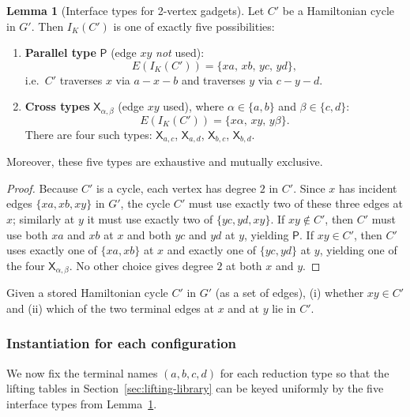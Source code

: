 \documentclass[12pt]{article}
\theoremstyle{definition}
\newtheorem{lemma}[theorem]{Lemma}
\newcommand{\CtwoGadgetVertices}{2}
\begin{document}
\begin{lemma}[Interface types for \CtwoGadgetVertices-vertex gadgets]
\label{lem:interfaces-2vertex}
Let $C'$ be a Hamiltonian cycle in $G'$. Then $I_K(C')$ is one of exactly five
possibilities:
\begin{enumerate}
    \item \textbf{Parallel type} $\mathsf{P}$ (edge $xy$ \emph{not} used):
    \[
    E(I_K(C'))=\{xa,\,xb,\,yc,\,yd\},
    \]
    i.e.\ $C'$ traverses $x$ via $a\!-\!x\!-\!b$ and traverses $y$ via
    $c\!-\!y\!-\!d$.

    \item \textbf{Cross types} $\mathsf{X}_{\alpha,\beta}$ (edge $xy$ used), where
    $\alpha\in\{a,b\}$ and $\beta\in\{c,d\}$:
    \[
    E(I_K(C'))=\{x\alpha,\,xy,\,y\beta\}.
    \]
    There are four such types: $\mathsf{X}_{a,c}$, $\mathsf{X}_{a,d}$,
    $\mathsf{X}_{b,c}$, $\mathsf{X}_{b,d}$.
\end{enumerate}
Moreover, these five types are exhaustive and mutually exclusive.
\end{lemma}

\begin{proof}
Because $C'$ is a cycle, each vertex has degree $2$ in $C'$.
Since $x$ has incident edges $\{xa,xb,xy\}$ in $G'$, the cycle $C'$ must use
exactly two of these three edges at $x$; similarly at $y$ it must use exactly
two of $\{yc,yd,xy\}$.
If $xy\notin C'$, then $C'$ must use both $xa$ and $xb$ at $x$ and both $yc$ and
$yd$ at $y$, yielding $\mathsf{P}$.
If $xy\in C'$, then $C'$ uses exactly one of $\{xa,xb\}$ at $x$ and exactly one
of $\{yc,yd\}$ at $y$, yielding one of the four $\mathsf{X}_{\alpha,\beta}$.
No other choice gives degree $2$ at both $x$ and $y$.
\end{proof}

Given a stored Hamiltonian cycle $C'$ in $G'$ (as a set of edges),
(i) whether $xy\in C'$ and (ii) which of the two terminal edges at $x$ and at $y$
lie in $C'$.

\subsubsection{Instantiation for each configuration}
\label{subsubsec:interface-instantiations}

We now fix the terminal names $(a,b,c,d)$ for each reduction type so that the
lifting tables in Section~\ref{sec:lifting-library} can be keyed uniformly by the
five interface types from Lemma~\ref{lem:interfaces-2vertex}.
\end{document}
